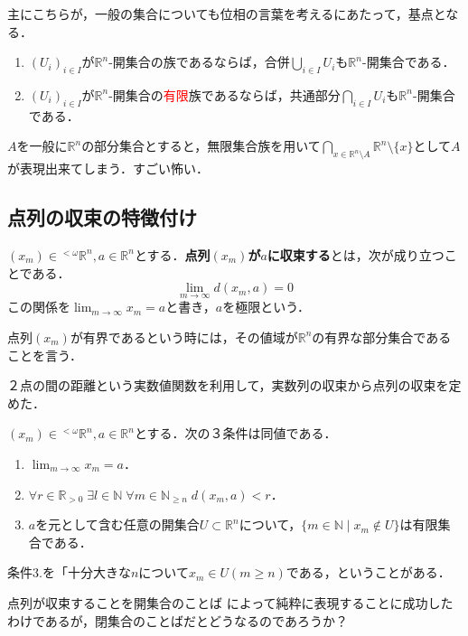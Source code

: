 \documentclass[uplatex,dvipdfmx]{jsreport}
\begin{document}
主にこちらが，一般の集合についても位相の言葉を考えるにあたって，基点となる．
\begin{proposition}[開集合の性質]\mbox{}\label{prop-properties-of-open-set-in-metric-spaces}
    \begin{enumerate}
        \item $(U_i)_{i\in I}$が$\mathbb{R}^n$-開集合の族であるならば，合併$\bigcup_{i\in I}U_i$も$\mathbb{R}^n$-開集合である．
        \item $(U_i)_{i\in I}$が$\mathbb{R}^n$-開集合の\textcolor{red}{有限}族であるならば，共通部分$\bigcap_{i\in I}U_i$も$\mathbb{R}^n$-開集合である．
    \end{enumerate}
\end{proposition}
\begin{remark}
    $A$を一般に$\mathbb{R}^n$の部分集合とすると，無限集合族を用いて$\bigcap_{x\in\mathbb{R}^n\setminus A}\mathbb{R}^n\setminus\{x\}$として$A$が表現出来てしまう．すごい怖い．
\end{remark}

\subsection{点列の収束の特徴付け}

\begin{definition}[点列の収束]
    $(x_m)\in{}^{<\omega}\mathbb{R}^n,a\in\mathbb{R}^n$とする．\textbf{点列$(x_m)$が$a$に収束する}とは，次が成り立つことである．
    \[ \lim_{m\to\infty}d(x_m,a)=0 \]
    この関係を$\lim_{m\to\infty}x_m=a$と書き，$a$を極限という．

    点列$(x_m)$が有界であるという時には，その値域が$\mathbb{R}^n$の有界な部分集合であることを言う．
\end{definition}
\begin{remark}
    ２点の間の距離という実数値関数を利用して，実数列の収束から点列の収束を定めた．
\end{remark}

\begin{proposition}[点列の収束の位相的特徴付け]\label{prop-characterization-of-convergence-in-metric-spaces}
    $(x_m)\in{}^{<\omega}\mathbb{R}^n, a\in\mathbb{R}^n$とする．次の３条件は同値である．
    \begin{enumerate}
        \item $\lim_{m\to\infty}x_m=a$．
        \item $\forall r\in\mathbb{R}_{>0}\;\exists l\in\mathbb{N}\;\forall m\in\mathbb{N}_{\ge n}\; d(x_m,a)<r$．
        \item $a$を元として含む任意の開集合$U\subset\mathbb{R}^n$について，$\{m\in\mathbb{N}\mid x_m\notin U\}$は有限集合である．
    \end{enumerate}
    条件3.を「十分大きな$n$について$x_m\in U (m\ge n)$である，ということがある．
\end{proposition}
\begin{remark}
    点列が収束することを開集合のことば
    によって純粋に表現することに成功したわけであるが，閉集合のことばだとどうなるのであろうか？
\end{remark}
\end{document}
